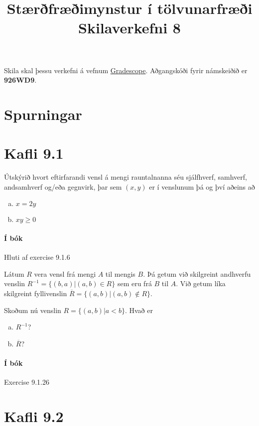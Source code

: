 \documentclass{exam}
\title{Stærðfræðimynstur í tölvunarfræði \\ Skilaverkefni 8}
\author{}
\begin{document}
\maketitle
\thispagestyle{empty} 

Skila skal þessu verkefni á vefnum \href{https://gradescope.com/}{Gradescope}. Aðgangskóði fyrir námskeiðið er \textbf{926WD9}.


\section{Spurningar}

\begin{questions}

\section{Kafli 9.1}

\question Útskýrið hvort eftirfarandi vensl á mengi rauntalnanna séu sjálfhverf, samhverf, andsamhverf og/eða gegnvirk, þar sem $(x, y)$ er í venslunum þá og því aðeins að
\begin{enumerate}[a)]
 \item $x = 2y$
 \item $xy \geq 0$
\end{enumerate}

\paragraph{Í bók} Hluti af exercise 9.1.6

\question Látum $R$ vera vensl frá mengi $A$ til mengis $B$. Þá getum við skilgreint andhverfu venslin $R^{-1} = \{(b, a) | (a, b) \in R\}$ sem eru frá $B$ til $A$. Við getum líka skilgreint fyllivenslin $\overline{R} = \{(a, b) | (a, b) \notin R\}$.

Skoðum nú venslin $R = \{(a, b) | a < b\}$. Hvað er

\begin{enumerate}[a)]
 \item $R^{-1}$?
 \item $\overline{R}$?
\end{enumerate}

\paragraph{Í bók} Exercise 9.1.26

\section{Kafli 9.2}


\end{questions}
\end{document}
